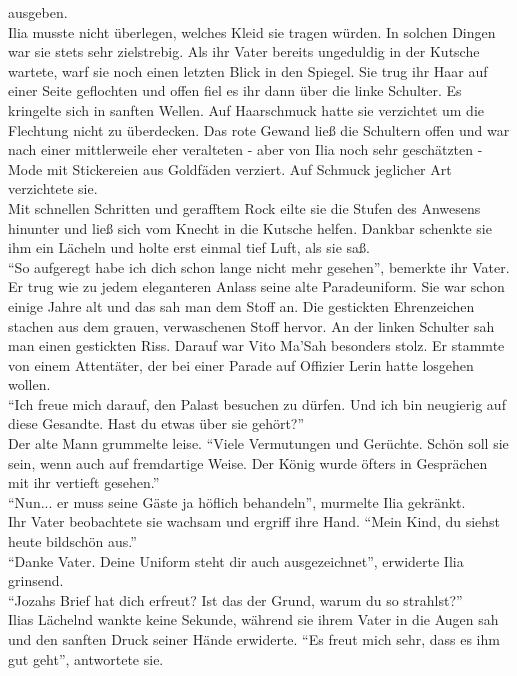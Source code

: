 ausgeben.\\
Ilia musste nicht überlegen, welches Kleid sie tragen würden. In solchen Dingen war sie stets sehr 
zielstrebig. Als ihr Vater bereits ungeduldig in der Kutsche wartete, warf sie noch einen letzten 
Blick in den Spiegel. Sie trug ihr Haar auf einer Seite geflochten und offen fiel es ihr dann über 
die linke Schulter. Es kringelte sich in sanften Wellen. Auf Haarschmuck hatte sie verzichtet um 
die Flechtung nicht zu überdecken. Das rote Gewand ließ die Schultern offen und war nach einer 
mittlerweile eher veralteten - aber von Ilia noch sehr geschätzten - Mode mit Stickereien aus 
Goldfäden verziert. Auf Schmuck jeglicher Art verzichtete sie. \\
Mit schnellen Schritten und gerafftem Rock eilte sie die Stufen des Anwesens hinunter und ließ sich 
vom Knecht in die Kutsche helfen. Dankbar schenkte sie ihm ein Lächeln und holte erst einmal tief 
Luft, als sie saß.\\
``So aufgeregt habe ich dich schon lange nicht mehr gesehen'', bemerkte ihr Vater.\\
Er trug wie zu jedem eleganteren Anlass seine alte Paradeuniform. Sie war schon einige Jahre alt 
und das sah man dem Stoff an. Die gestickten Ehrenzeichen stachen aus dem grauen, verwaschenen 
Stoff hervor. An der linken Schulter sah man einen gestickten Riss. Darauf war Vito Ma'Sah 
besonders stolz. Er stammte von einem Attentäter, der bei einer Parade auf Offizier Lerin hatte 
losgehen wollen.\\
``Ich freue mich darauf, den Palast besuchen zu dürfen. Und ich bin neugierig auf diese Gesandte. 
Hast du etwas über sie gehört?''\\
Der alte Mann grummelte leise. ``Viele Vermutungen und Gerüchte. Schön soll sie sein, wenn auch 
auf fremdartige Weise. Der König wurde öfters in Gesprächen mit ihr vertieft gesehen.''\\
``Nun... er muss seine Gäste ja höflich behandeln'', murmelte Ilia gekränkt.\\
Ihr Vater beobachtete sie wachsam und ergriff ihre Hand. ``Mein Kind, du siehst heute bildschön 
aus.''\\
``Danke Vater. Deine Uniform steht dir auch ausgezeichnet'', erwiderte Ilia grinsend.\\
``Jozahs Brief hat dich erfreut? Ist das der Grund, warum du so strahlst?''\\
Ilias Lächelnd wankte keine Sekunde, während sie ihrem Vater in die Augen sah und den sanften Druck 
seiner Hände erwiderte. ``Es freut mich sehr, dass es ihm gut geht'', antwortete sie.\\
